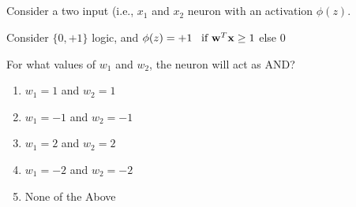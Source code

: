 \begin{frame}
\section{}
  Consider a two input (i.e., $x_1$ and $x_2$ neuron with an activation $\phi(z)$.

  Consider $\{0,+1\}$ logic, and $\phi(z) = +1\,\,\,  \mbox{ if } {\bf w}^T{\bf x} \geq 1$ else 0

  For what values of $w_1$ and $w_2$, the neuron will act as AND?
     \begin{enumerate}[label=(\Alph*)]
       \item $w_1=1$ and $w_2=1$
      \item $w_1=-1$ and $w_2=-1$
      \item $w_1=2$ and $w_2=2$
      \item $w_1=-2$ and $w_2=-2$
      \item None of the Above    %
     \end{enumerate}
\end{frame}
